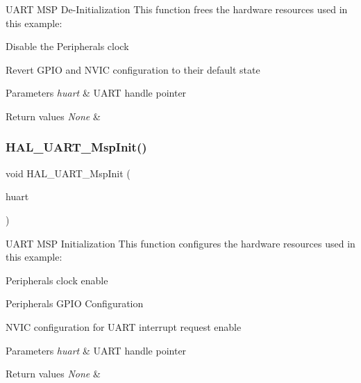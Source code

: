 U\+A\+RT M\+SP De-\/\+Initialization This function frees the hardware resources used in this example\+: 


\begin{DoxyItemize}
\item Disable the Peripheral\textquotesingle{}s clock
\item Revert G\+P\+IO and N\+V\+IC configuration to their default state 
\begin{DoxyParams}{Parameters}
{\em huart} & U\+A\+RT handle pointer \\
\hline
\end{DoxyParams}

\begin{DoxyRetVals}{Return values}
{\em None} & \\
\hline
\end{DoxyRetVals}

\end{DoxyItemize}\mbox{\label{group__HAL__MSP__Private__Functions_ga13f0f8431d6ec49733ccfa381972f0dd}} 
\subsubsection{\texorpdfstring{H\+A\+L\+\_\+\+U\+A\+R\+T\+\_\+\+Msp\+Init()}{HAL\_UART\_MspInit()}}
{\footnotesize\ttfamily void H\+A\+L\+\_\+\+U\+A\+R\+T\+\_\+\+Msp\+Init (\begin{DoxyParamCaption}\item[{U\+A\+R\+T\+\_\+\+Handle\+Type\+Def $\ast$}]{huart }\end{DoxyParamCaption})}



U\+A\+RT M\+SP Initialization This function configures the hardware resources used in this example\+: 


\begin{DoxyItemize}
\item Peripheral\textquotesingle{}s clock enable
\item Peripheral\textquotesingle{}s G\+P\+IO Configuration
\item N\+V\+IC configuration for U\+A\+RT interrupt request enable 
\begin{DoxyParams}{Parameters}
{\em huart} & U\+A\+RT handle pointer \\
\hline
\end{DoxyParams}

\begin{DoxyRetVals}{Return values}
{\em None} & \\
\hline
\end{DoxyRetVals}

\end{DoxyItemize}